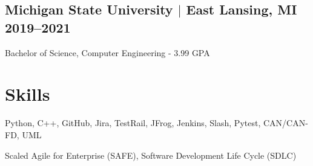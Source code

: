 \documentclass[10pt]{article}
\begin{document}
\subsection{Michigan State University $|$ {\normalfont East Lansing, MI} \hfill 2019--2021}
\noindent Bachelor of Science, Computer Engineering - 3.99 GPA

\section{Skills}
\begin{description}[itemsep=0pt]
	\item[Technologies] Python, C++, GitHub, Jira, TestRail, JFrog, Jenkins, Slash, Pytest, CAN/CAN-FD, UML
	\item[Practices] Scaled Agile for Enterprise (SAFE), Software Development Life Cycle (SDLC)
\end{description}
\end{document}
